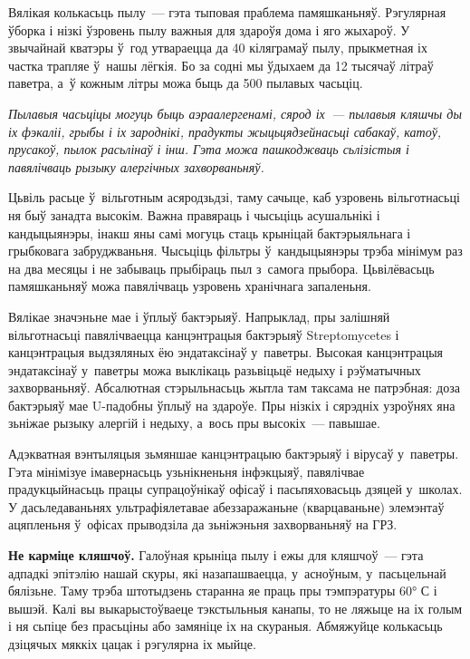 
Вялікая колькасьць пылу~--- гэта тыповая праблема памяшканьняў. Рэгулярная ўборка і нізкі ўзровень пылу важныя для здароўя дома і яго жыхароў. У звычайнай кватэры ў~год утвараецца да 40 кіляграмаў пылу, прыкметная іх частка трапляе ў~нашы лёгкія. Бо за содні мы ўдыхаем да 12 тысячаў літраў паветра, а~ў кожным літры можа быць да 500 пылавых часьціц.

\emph{Пылавыя часьціцы могуць быць аэраалергенамі, сярод іх~--- пылавыя кляшчы ды іх фэкаліі, грыбы і іх зароднікі, прадукты жыцьцядзейнасьці сабакаў, катоў, прусакоў, пылок расьлінаў і інш. Гэта можа пашкоджваць сьлізістыя і павялічваць рызыку алергічных захворваньняў.}

Цьвіль расьце ў~вільготным асяродзьдзі, таму сачыце, каб узровень вільготнасьці ня быў занадта высокім. Важна правяраць і чысьціць асушальнікі і кандыцыянэры, інакш яны самі могуць стаць крыніцай бактэрыяльнага і грыбковага забруджваньня. Чысьціць фільтры ў~кандыцыянэры трэба мінімум раз на два месяцы і не забываць прыбіраць пыл з~самога прыбора. Цьвілёвасьць памяшканьняў можа павялічваць узровень хранічнага запаленьня.

Вялікае значэньне мае і ўплыў бактэрыяў. Напрыклад, пры залішняй вільготнасьці павялічваецца канцэнтрацыя бактэрыяў Streptomycetes і канцэнтрацыя выдзяляных ёю эндатаксінаў у~паветры. Высокая канцэнтрацыя эндатаксінаў у~паветры можа выклікаць разьвіцьцё недыху і рэўматычных захворваньняў. Абсалютная стэрыльнасьць жытла там таксама не патрэбная: доза бактэрыяў мае U-падобны ўплыў на здароўе. Пры нізкіх і сярэдніх узроўнях яна зьніжае рызыку алергій і недыху, а~вось пры высокіх~--- павышае.

Адэкватная вэнтыляцыя зьмяншае канцэнтрацыю бактэрыяў і вірусаў у~паветры. Гэта мінімізуе імавернасьць узьнікненьня інфэкцыяў, павялічвае прадукцыйнасьць працы супрацоўнікаў офісаў і пасьпяховасьць дзяцей у~школах. У дасьледаваньнях ультрафіялетавае абеззаражаньне (кварцаваньне) элемэнтаў ацяпленьня ў~офісах прыводзіла да зьніжэньня захворваньняў на ГРЗ.


\textbf{Не карміце кляшчоў.} Галоўная крыніца пылу і ежы для кляшчоў~--- гэта адпадкі эпітэлію нашай скуры, які назапашваецца, у~асноўным, у~пасьцельнай бялізьне. Таму трэба штотыдзень старанна яе праць пры тэмпэратуры 60° С і вышэй. Калі вы выкарыстоўваеце тэкстыльныя канапы, то не ляжыце на іх голым і ня сьпіце без прасьціны або замяніце іх на скураныя. Абмяжуйце колькасьць дзіцячых мяккіх цацак і рэгулярна іх мыйце.

